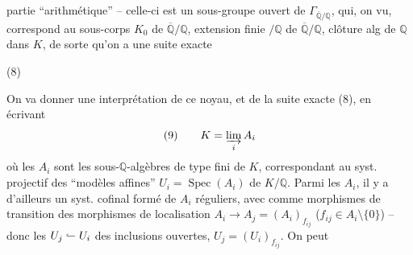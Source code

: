 partie ``arithmétique'' -- celle-ci est un sous-groupe ouvert de $\Gamma_{\overline{\mathbb Q}/\mathbb Q}$, qui, on  vu, correspond au sous-corps $K_0$ de $\overline{\mathbb Q}/\mathbb Q$,  extension finie $/\mathbb Q$ de $\overline{\mathbb Q}/\mathbb Q$, clôture alg de $\mathbb Q$ dans $K$, de sorte qu'on a une suite exacte

\noindent (8)\quad{}

On va donner une interprétation de ce noyau, et de la suite exacte (8), en écrivant
\[
(9)\qquad K=\varinjlim_i A_i
\]
où les $A_i$ sont les sous-$\mathbb Q$-algèbres de type fini de $K$, correspondant au syst. projectif des ``modèles affines'' $U_i=\operatorname{Spec}(A_i)$ de $K/\mathbb Q$. Parmi les $A_i$, il y a d'ailleurs un syst. cofinal formé de $A_i$ réguliers,  avec comme morphismes de transition des morphismes de localisation $A_i\longrightarrow A_j=(A_i)_{f_{ij}}$ ($f_{ij}\in A_i\setminus\{0\}$) -- donc les $U_j\lhook\joinrel\relbar U_i$ des inclusions ouvertes, $U_j=(U_i)_{f_{ij}}$. On peut
